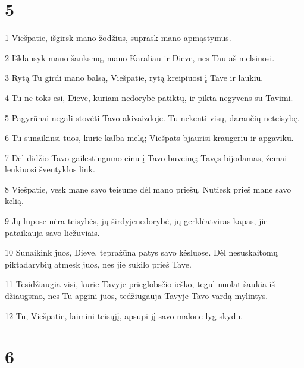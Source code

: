 \chapter{5}


\par 1 Viešpatie, išgirsk mano žodžius, suprask mano apmąstymus. 
\par 2 Išklausyk mano šauksmą, mano Karaliau ir Dieve, nes Tau aš melsiuosi. 
\par 3 Rytą Tu girdi mano balsą, Viešpatie, rytą kreipiuosi į Tave ir laukiu. 
\par 4 Tu ne toks esi, Dieve, kuriam nedorybė patiktų, ir pikta negyvens su Tavimi. 
\par 5 Pagyrūnai negali stovėti Tavo akivaizdoje. Tu nekenti visų, darančių neteisybę. 
\par 6 Tu sunaikinsi tuos, kurie kalba melą; Viešpats bjaurisi kraugeriu ir apgaviku. 
\par 7 Dėl didžio Tavo gailestingumo einu į Tavo buveinę; Tavęs bijodamas, žemai lenkiuosi šventyklos link. 
\par 8 Viešpatie, vesk mane savo teisume dėl mano priešų. Nutiesk prieš mane savo kelią. 
\par 9 Jų lūpose nėra teisybės, jų širdyje­nedorybė, jų gerklė­atviras kapas, jie pataikauja savo liežuviais. 
\par 10 Sunaikink juos, Dieve, tepražūna patys savo kėsluose. Dėl nesuskaitomų piktadarybių atmesk juos, nes jie sukilo prieš Tave. 
\par 11 Tesidžiaugia visi, kurie Tavyje prieglobsčio ieško, tegul nuolat šaukia iš džiaugsmo, nes Tu apgini juos, tedžiūgauja Tavyje Tavo vardą mylintys. 
\par 12 Tu, Viešpatie, laimini teisųjį, apsupi jį savo malone lyg skydu.



\chapter{6}


